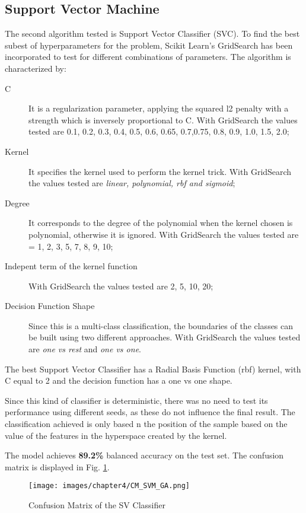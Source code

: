 \subsection{Support Vector Machine}
The second algorithm tested is Support Vector Classifier (SVC). 
To find the best subest of hyperparameters for the problem, Scikit Learn's GridSearch has been incorporated to test for different combinations of parameters.
The algorithm is characterized by:
\begin{description}
    \item[C] It is a regularization parameter, applying the squared l2 penalty with a strength which is inversely proportional to C. With GridSearch the values tested are 0.1, 0.2, 0.3, 0.4, 0.5, 0.6, 0.65, 0.7,0.75, 0.8, 0.9, 1.0, 1.5, 2.0;
    \item[Kernel] It specifies the kernel used to perform the kernel trick. With GridSearch the values tested are \textit{linear, polynomial, rbf and sigmoid};
    \item[Degree] It corresponds to the degree of the polynomial when the kernel chosen is polynomial, otherwise it is ignored. With GridSearch the values tested are = 1, 2, 3, 5, 7, 8, 9, 10;
    \item[Indepent term of the kernel function]  With GridSearch the values tested are 2, 5, 10, 20;
    \item[Decision Function Shape] Since this is a multi-class classification, the boundaries of the classes can be built using two different approaches. With GridSearch the values tested are \textit{one vs rest} and \textit{one vs one}.
\end{description}

The best Support Vector Classifier has a Radial Basis Function (rbf) kernel, with C equal to 2 and the decision function has a one vs one shape.

Since this kind of classifier is deterministic, there was no need to test its performance using different seeds, as these do not influence the final result. The classification achieved is only based n the position of the sample based on the value of the features in the hyperspace created by the kernel.


The model achieves \textbf{89.2\%} balanced accuracy on the test set. The confusion matrix is displayed in Fig. \ref{fig:CM_SVM_GA}.

\begin{figure}[h!]
    \centering
    \texttt{[image: images/chapter4/CM\_SVM\_GA.png]}
    \caption{Confusion Matrix of the SV Classifier}
    \label{fig:CM_SVM_GA}
\end{figure}

